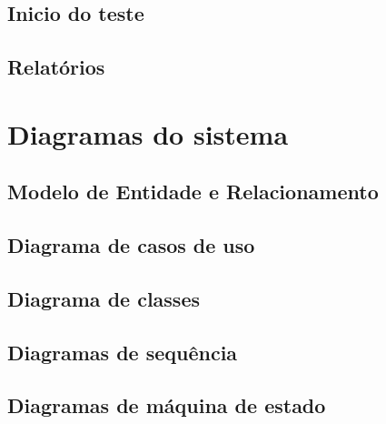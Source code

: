 \subsection{Inicio do teste}

\subsection{Relatórios}

\section{Diagramas do sistema}

\subsection{Modelo de Entidade e Relacionamento \cite{26}}

\subsection{Diagrama de casos de uso \cite{27}}

\subsection{Diagrama de classes \cite{27}}

\subsection{Diagramas de sequência \cite{28}}

\subsection{Diagramas de máquina de estado \cite{30}}
